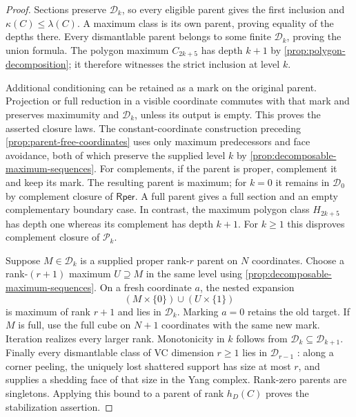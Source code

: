 \documentclass[11pt]{article}
\theoremstyle{definition}
\newcommand{\Rper}{\mathsf{Rper}}
\begin{document}
\begin{proof}
Sections preserve $\mathcal D_k$, so every eligible parent gives the first
inclusion and $\kappa(C)\le\lambda(C)$. A maximum class is its own
parent, proving equality of the depths there. Every dismantlable parent
belongs to some finite $\mathcal D_k$, proving the union formula.
The polygon maximum $C_{2k+5}$ has depth $k+1$ by
\cref{prop:polygon-decomposition}; it therefore witnesses the strict
inclusion at level $k$.

Additional conditioning can be retained as a mark on the original parent.
Projection or full reduction in a visible coordinate commutes with that
mark and preserves maximumity and $\mathcal D_k$, unless its output is
empty. This proves the asserted closure laws. The constant-coordinate
construction preceding \cref{prop:parent-free-coordinates} uses only
maximum predecessors and face avoidance, both of which preserve the
supplied level $k$ by \cref{prop:decomposable-maximum-sequences}.
For complements, if the parent is proper, complement it and keep its mark.
The resulting parent is maximum; for $k=0$ it remains in $\mathcal D_0$
by complement closure of $\Rper$. A full parent gives a full section and
an empty complementary boundary case. In contrast, the maximum polygon
class $H_{2k+5}$ has depth one whereas its complement has depth $k+1$.
For $k\ge1$ this disproves complement closure of $\mathcal P_k$.

Suppose $M\in\mathcal D_k$ is a supplied proper rank-$r$ parent on $N$
coordinates. Choose a rank-$(r+1)$ maximum $U\supseteq M$ in the same
level using \cref{prop:decomposable-maximum-sequences}. On a fresh
coordinate $a$, the nested expansion
\[
 (M\times\{0\})\cup(U\times\{1\})
\]
is maximum of rank $r+1$ and lies in $\mathcal D_k$. Marking $a=0$
retains the old target. If $M$ is full, use the full cube on $N+1$
coordinates with the same new mark. Iteration realizes every larger rank.
Monotonicity in $k$ follows from $\mathcal D_k\subseteq\mathcal D_{k+1}$.
Finally every dismantlable class of VC dimension $r\ge1$ lies in
$\mathcal D_{r-1}$ \cite{RecursiveClasses}: along a corner peeling,
the uniquely lost shattered support has size at most $r$, and supplies
a shedding face of that size in the Yang complex. Rank-zero parents
are singletons. Applying this bound to a parent of rank $h_D(C)$ proves
the stabilization assertion.
\end{proof}
\end{document}
